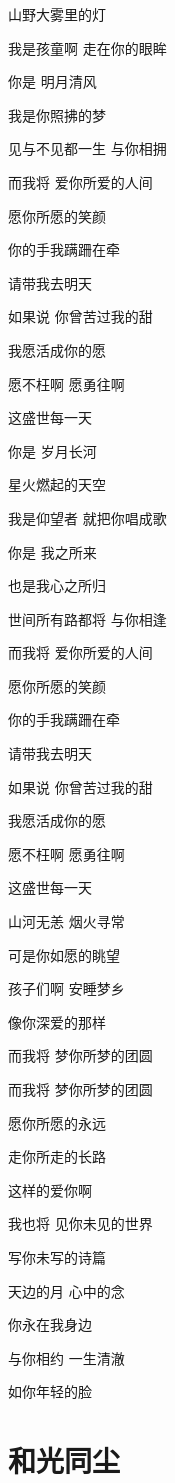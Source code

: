 \documentclass[]{ctexbook}
\begin{document}
山野大雾里的灯

我是孩童啊 走在你的眼眸

你是 明月清风

我是你照拂的梦

见与不见都一生 与你相拥

而我将 爱你所爱的人间

愿你所愿的笑颜

你的手我蹒跚在牵

请带我去明天

如果说 你曾苦过我的甜

我愿活成你的愿

愿不枉啊 愿勇往啊

这盛世每一天

你是 岁月长河

星火燃起的天空

我是仰望者 就把你唱成歌

你是 我之所来

也是我心之所归

世间所有路都将 与你相逢

而我将 爱你所爱的人间

愿你所愿的笑颜

你的手我蹒跚在牵

请带我去明天

如果说 你曾苦过我的甜

我愿活成你的愿

愿不枉啊 愿勇往啊

这盛世每一天

山河无恙 烟火寻常

可是你如愿的眺望

孩子们啊 安睡梦乡

像你深爱的那样

而我将 梦你所梦的团圆

而我将 梦你所梦的团圆

愿你所愿的永远

走你所走的长路

这样的爱你啊

我也将 见你未见的世界

写你未写的诗篇

天边的月 心中的念

你永在我身边

与你相约 一生清澈

如你年轻的脸

\section*{和光同尘}\label{stay-with-light}
\end{document}
